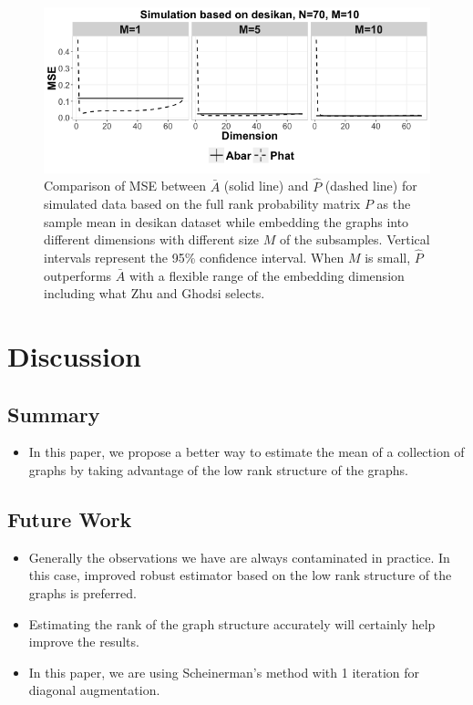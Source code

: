 \documentclass[a4paper]{article}
\begin{document}
\begin{figure}[!htb]
\centering
\includegraphics[width=1\textwidth]{sim_desikan.png}
\caption{Comparison of MSE between $\bar{A}$ (solid line) and $\hat{P}$ (dashed line) for simulated data based on the full rank probability matrix $P$ as the sample mean in desikan dataset while embedding the graphs into different dimensions with different size $M$ of the subsamples. Vertical intervals represent the 95\% confidence interval. When $M$ is small, $\hat{P}$ outperforms $\bar{A}$ with a flexible range of the embedding dimension including what Zhu and Ghodsi selects.}
\label{fig:sim_desikan}
\end{figure}



\section{Discussion}

\subsection{Summary}
\begin{itemize}
\item In this paper, we propose a better way to estimate the mean of a collection of graphs by taking advantage of the low rank structure of the graphs.
\end{itemize}

\subsection{Future Work}
\begin{itemize}
\item Generally the observations we have are always contaminated in practice. In this case, improved robust estimator based on the low rank structure of the graphs is preferred.
\item Estimating the rank of the graph structure accurately will certainly help improve the results.
\item In this paper, we are using Scheinerman's method with 1 iteration for diagonal augmentation.
\end{itemize}
\end{document}
